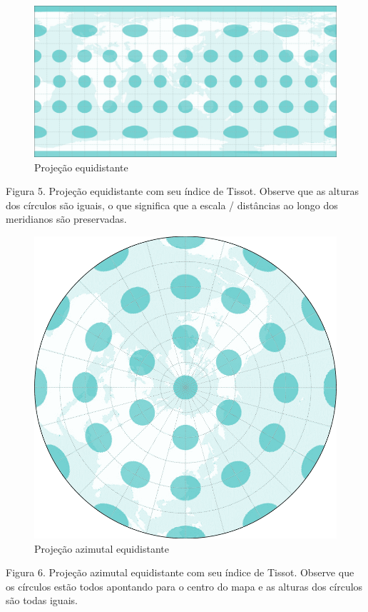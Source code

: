 \documentclass[
]{krantz}
\begin{document}
\begin{figure}
\centering
\includegraphics{media/modulo0/equidistant.png}
\caption{Projeção equidistante}
\end{figure}

Figura 5. Projeção equidistante com seu índice de Tissot. Observe que as alturas dos círculos são iguais, o que significa que a escala / distâncias ao longo dos meridianos são preservadas.

\begin{figure}
\centering
\includegraphics{media/modulo0/az-equidistant.png}
\caption{Projeção azimutal equidistante}
\end{figure}

Figura 6. Projeção azimutal equidistante com seu índice de Tissot. Observe que os círculos estão todos apontando para o centro do mapa e as alturas dos círculos são todas iguais.
\end{document}
